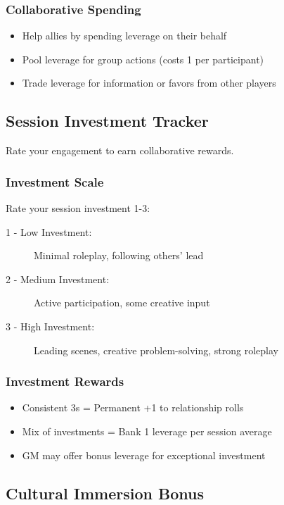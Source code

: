 \subsubsection{Collaborative Spending}

\begin{itemize}
\item Help allies by spending leverage on their behalf
\item Pool leverage for group actions (costs 1 per participant)
\item Trade leverage for information or favors from other players
\end{itemize}

\subsection{Session Investment Tracker}

Rate your engagement to earn collaborative rewards.

\subsubsection{Investment Scale}

Rate your session investment 1-3:
\begin{description}
\item[1 - Low Investment:] Minimal roleplay, following others' lead
\item[2 - Medium Investment:] Active participation, some creative input
\item[3 - High Investment:] Leading scenes, creative problem-solving, strong roleplay
\end{description}

\subsubsection{Investment Rewards}

\begin{itemize}
\item Consistent 3s = Permanent +1 to relationship rolls
\item Mix of investments = Bank 1 leverage per session average
\item GM may offer bonus leverage for exceptional investment
\end{itemize}

\subsection{Cultural Immersion Bonus}

